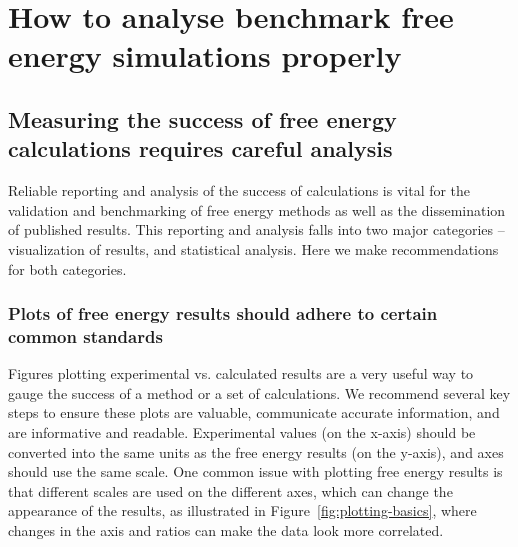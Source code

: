 \documentclass[9pt,bestpractices]{livecoms}
\begin{document}
\section{How to analyse benchmark free energy simulations properly}
\label{sec:analysis}

\subsection{Measuring the success of free energy calculations requires careful analysis}

Reliable reporting and analysis of the success of calculations is vital for the validation and benchmarking of free energy methods as well as the dissemination of published results. This reporting and analysis falls into two major categories -- visualization of results, and statistical analysis. Here we make recommendations for both categories.

\subsubsection{Plots of free energy results should adhere to certain common standards}
\label{sec:plotting_results}
Figures plotting experimental vs. calculated results are a very useful way to gauge the success of a method or a set of calculations. We recommend several key steps to ensure these plots are valuable, communicate accurate information, and are informative and readable. Experimental values (on the x-axis) should be converted into the same units as the free energy results (on the y-axis), and axes should use the same scale. One common issue with plotting free energy results is that different scales are used on the different axes, which can change the appearance of the results, as illustrated in Figure~\ref{fig:plotting-basics}, where changes in the axis and ratios can make the data look more correlated.
\end{document}
